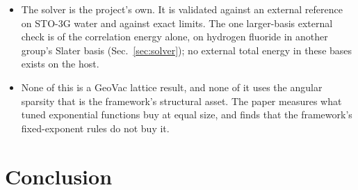 \documentclass[aps,pra,twocolumn,superscriptaddress,longbibliography]{revtex4-2}
\begin{document}
\begin{itemize}
(Sec.~\ref{sec:r3}).
\item The solver is the project's own.  It is validated against an
external reference on STO-3G water and against exact limits.  The one
larger-basis external check is of the correlation energy alone, on
hydrogen fluoride in another group's Slater basis
(Sec.~\ref{sec:solver}); no external total energy in these bases exists
on the host.
\item None of this is a GeoVac lattice result, and none of it uses the
angular sparsity that is the framework's structural asset.  The paper
measures what tuned exponential functions buy at equal size, and finds
that the framework's fixed-exponent rules do not buy it.
\end{itemize}

\section{Conclusion}
\label{sec:conclusion}
\end{document}
